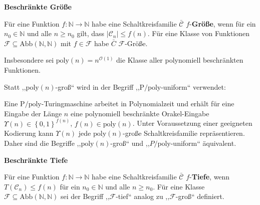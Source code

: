 \begin{defn}
\textbf{Beschränkte Größe}

Für eine Funktion $f:\mathbb{N}\rightarrow\mathbb{N}$ habe eine Schaltkreisfamilie
$\bar{\mathcal{C}}$ $f$-\textbf{Größe}, wenn für ein $n_{0}\in\mathbb{N}$
und alle $n\geqslant n_{0}$ gilt, dass $\left|\mathcal{C}_{n}\right|\leqslant f\left(n\right)$.
Für eine Klasse von Funktionen $\mathcal{F}\subseteq\mathrm{Abb}\left(\mathbb{N},\mathbb{N}\right)$
mit $f\in\mathcal{F}$ habe $\bar{C}$ $\mathcal{F}$-Größe.

Insbesondere sei $\mathrm{poly}\left(n\right)=n^{\mathcal{O}\left(1\right)}$
die Klasse aller polynomiell beschränkten Funktionen.
\end{defn}
\begin{rem*}
Statt ,,$\mathrm{poly}\left(n\right)$-groß`` wird in \cite{AD2014}
der Begriff ,,$\mathrm{P}/\mathrm{poly}$-uniform`` verwendet:

Eine $\mathrm{P/poly}$-Turingmaschine arbeitet in Polynomialzeit
und erhält für eine Eingabe der Länge $n$ eine polynomiell beschränkte
Orakel-Eingabe $\Upsilon\left(n\right)\in\left\{ 0,1\right\} ^{f\left(n\right)}$,
$f\left(n\right)\in\mathrm{poly}\left(n\right)$. Unter Voraussetzung
einer geeigneten Kodierung kann $\Upsilon\left(n\right)$ jede $\mathrm{poly}\left(n\right)$-große
Schaltkreisfamilie repräsentieren\cite{arora-barak}. Daher sind die
Begriffe ,,$\mathrm{poly}\left(n\right)$-groß`` und ,,$P/\mathrm{poly}$-uniform``
äquivalent.
\end{rem*}
\begin{defn}
\textbf{Beschränkte Tiefe}

Für eine Funktion $f:\mathbb{N}\rightarrow\mathbb{N}$ habe eine Schaltkreisfamilie
$\bar{\mathcal{C}}$ $f$-\textbf{Tiefe}, wenn $T\left(\mathcal{C}_{n}\right)\leqslant f\left(n\right)$
für ein $n_{0}\in\mathbb{N}$ und alle $n\geqslant n_{0}$. Für eine
Klasse $\mathcal{F}\subseteq\mathrm{Abb}\left(\mathbb{N},\mathbb{N}\right)$
sei der Begriff ,,$\mathcal{F}$-tief`` analog zu ,,$\mathcal{F}$-groß``
definiert.
\end{defn}

